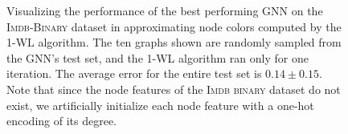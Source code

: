 \begin{figure}[!ht]
\begin{minipage}[b]{0.53007147296\textwidth}
    \end{minipage}
    \hfill
    \caption{Visualizing the performance of the best performing GNN on the \textsc{Imdb-Binary} dataset in approximating node colors computed by the 1-WL algorithm. The ten graphs shown are randomly sampled from the GNN's test set, and the 1-WL algorithm ran only for one iteration. The average error for the entire test set is $0.14 \pm 0.15$. \newline
    Note that since the node features of the \textsc{Imdb binary} dataset do not exist, we artificially initialize each node feature with a one-hot encoding of its degree.}
\end{figure}

\begin{figure}[!ht]
    \centering
    \begin{minipage}[b]{0.45992852703\textwidth}
        \centering

\end{minipage}
\end{figure}
